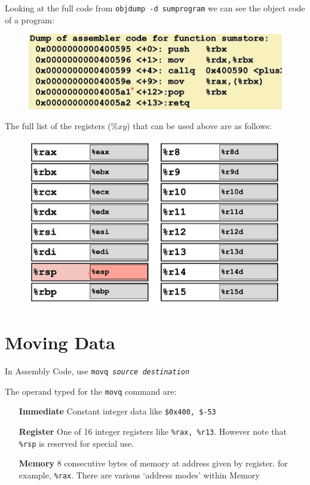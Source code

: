 \documentclass[12pt]{book}
\begin{document}
Looking at the full code from \texttt{objdump -d sumprogram} we can see the object code of a program:
\begin{figure}[h]
        \centering
        \includegraphics{./figures/objDump}
\end{figure}

The full list of the registers ($\%xy$) that can be used above are as follows:
 \begin{figure}[h]
         \centering
         \includegraphics[scale = 0.7]{./figures/objReg}
\end{figure}

\section*{Moving Data}
In Assembly Code, use \texttt{movq\textit{ source }\textit{destination}}

The operand typed for the \texttt{movq} command are:
\begin{itemize}
        \item[\textbf{Immediate}] Constant integer data like \texttt{\$0x400, \$-53}
        \item[\textbf{Register}] One of 16 integer registers like \texttt{\%rax, \%r13}. However note that \texttt{\%rsp} is reserved for
                special use.
        \item[\textbf{Memory}] 8 consecutive bytes of memory at address given by register. for example, \texttt{\%rax}. 
                There are various `address modes' within Memory
\end{itemize}
\end{document}
